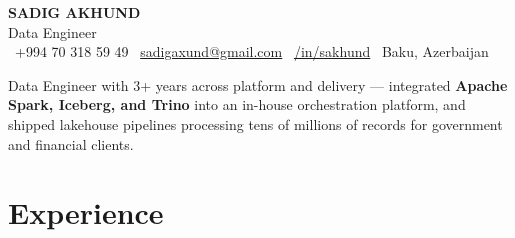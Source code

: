 \documentclass[letterpaper,10pt]{article}
\begin{document}
\begin{center}
    {\huge \textbf{\MakeUppercase{Sadig Akhund}}} \\[3pt]
    {\Large \color{accent} Data Engineer} \\[6pt]
    {\small
        \faPhone\ +994 70 318 59 49 \quad
        \faEnvelope\ \href{mailto:sadigaxund@gmail.com}{sadigaxund@gmail.com} \quad
        \faLinkedin\ \href{https://linkedin.com/in/sakhund}{/in/sakhund} \quad
        \faMapMarker*\ Baku, Azerbaijan
    }
\end{center}

\vspace{6pt}
{\small Data Engineer with 3+ years across platform and delivery --- integrated \textbf{Apache Spark, Iceberg, and Trino} into an in-house orchestration platform, and shipped lakehouse pipelines processing tens of millions of records for government and financial clients.\par}

\section{Experience}
\end{document}
